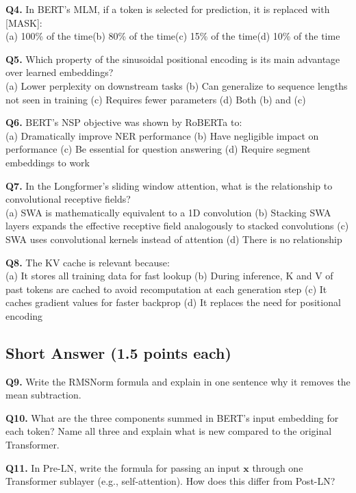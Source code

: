 \documentclass[11pt, a4paper]{article}
\begin{document}
\textbf{Q4.} In BERT's MLM, if a token is selected for prediction, it is replaced with [MASK]:\\
(a) 100\% of the time\quad (b) 80\% of the time\quad (c) 15\% of the time\quad (d) 10\% of the time

\textbf{Q5.} Which property of the sinusoidal positional encoding is its main advantage over learned embeddings?\\
(a) Lower perplexity on downstream tasks\quad
(b) Can generalize to sequence lengths not seen in training\quad
(c) Requires fewer parameters\quad
(d) Both (b) and (c)

\textbf{Q6.} BERT's NSP objective was shown by RoBERTa to:\\
(a) Dramatically improve NER performance\quad
(b) Have negligible impact on performance\quad
(c) Be essential for question answering\quad
(d) Require segment embeddings to work

\textbf{Q7.} In the Longformer's sliding window attention, what is the relationship to convolutional receptive fields?\\
(a) SWA is mathematically equivalent to a 1D convolution\quad
(b) Stacking SWA layers expands the effective receptive field analogously to stacked convolutions\quad
(c) SWA uses convolutional kernels instead of attention\quad
(d) There is no relationship

\textbf{Q8.} The KV cache is relevant because:\\
(a) It stores all training data for fast lookup\quad
(b) During inference, K and V of past tokens are cached to avoid recomputation at each generation step\quad
(c) It caches gradient values for faster backprop\quad
(d) It replaces the need for positional encoding

\subsection*{Short Answer (1.5 points each)}

\textbf{Q9.} Write the RMSNorm formula and explain in one sentence why it removes the mean subtraction.

\textbf{Q10.} What are the three components summed in BERT's input embedding for each token? Name all three and explain what is new compared to the original Transformer.

\textbf{Q11.} In Pre-LN, write the formula for passing an input $\mathbf{x}$ through one Transformer sublayer (e.g., self-attention). How does this differ from Post-LN?
\end{document}
